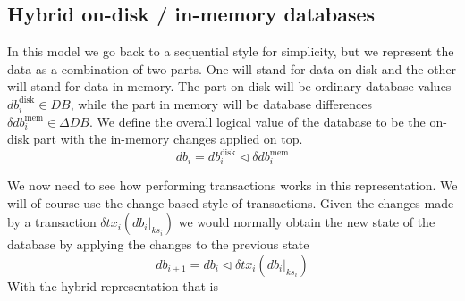 \documentclass[11pt,a4paper]{article}
\newcommand\restrict[2]{\left.#1\right|_{#2}}
\begin{document}
\subsection{Hybrid on-disk / in-memory databases}
\label{sec:hybrid-on-disk-in-memory-db}

In this model we go back to a sequential style for simplicity, but we represent
the data as a combination of two parts. One will stand for data on disk and the
other will stand for data in memory. The part on disk will be ordinary database
values $\mathit{db}^{\mathrm{disk}}_i \in \mathit{DB}$, while the part in
memory will be database differences
$\delta\mathit{db}^{\mathrm{mem}}_i \in \Delta\mathit{DB}$. We
define the  overall logical value of the database to be the on-disk part with
the in-memory changes applied on top.
\[
\mathit{db}_i = \mathit{db}^{\mathrm{disk}}_i \triangleleft \delta\mathit{db}^{\mathrm{mem}}_i
\]
\begin{center}
\end{center}
We now need to see how performing transactions works in this representation. We
will of course use the change-based style of transactions. Given the changes
made by a transaction $\delta\mathit{tx}_i(\restrict{\mathit{db}_i}{\mathit{ks}_i})$
we would normally obtain the new state of the database by applying the changes
to the previous state
\[
\mathit{db}_{i+1} = \mathit{db}_i \triangleleft \delta\mathit{tx}_i(\restrict{\mathit{db}_i}{\mathit{ks}_i})
\]
With the hybrid representation that is
\end{document}
